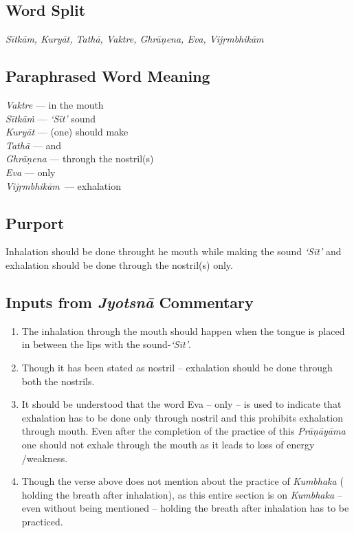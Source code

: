 \subsection*{Word Split}


\textit{Sītkām, Kuryāt, Tathā, Vaktre, Ghrāṇena, Eva, Vijṛmbhikām}

\subsection*{Paraphrased Word Meaning}


\begin{multicols}{2}
\textit{Vaktre} --- in the mouth \\
\textit{Sītkāṁ} --- \textit{‘Sīt’} sound \\
\textit{Kuryāt} --- (one) should make \\
\textit{Tathā}  --- and \\
\textit{Ghrāṇena} --- through the nostril(s)\\
\textit{Eva} --- only \\
\textit{Vijṛmbhikām }--- exhalation
\end{multicols}

\subsection*{Purport}


Inhalation should be done throught he mouth while making the sound \textit{‘Sīt’} and exhalation should be done through the nostril(s) only.

\subsection*{Inputs from \textit{Jyotsnā} Commentary}


\begin{enumerate}
\itemsep=0pt
\item The inhalation through the mouth should happen when the tongue is placed in between the lips with the sound-\textit{‘Sīt’}.
\item Though it has been stated as nostril – exhalation should be done through both the nostrils. 
\item It should be understood that the word Eva – only – is used to indicate that exhalation has to be done only through nostril and this prohibits exhalation through mouth. Even after the completion of the practice of this \textit{Prāṇāyāma} one should not exhale through the mouth as it leads to loss of energy /weakness. 
\item Though the verse above does not mention about the practice of \textit{Kumbhaka} ( holding the breath after inhalation), as this entire section is on \textit{Kumbhaka} – even without being mentioned – holding the breath after inhalation has to be practiced. 
\end{enumerate}

